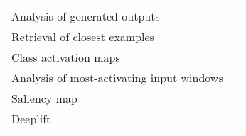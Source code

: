 \begin{tabular}{ll}
Analysis of generated outputs                          &                                                                                                                                                                               \cite{Hartmann2018} \\
Retrieval of closest examples                          &                                                                                                                                                                                  \cite{Deiss2018} \\
Class activation maps                                  &                                                                                                                                                                                  \cite{Ghosh2018} \\
Analysis of most-activating input windows              &                                                                                                                                                                              \cite{Hartmann2018b} \\
Saliency map                                           &                                                                                                                                                                               \cite{Vilamala2017} \\
Deeplift                                               &                                                                                                                                                                                \cite{Lawhern2018} \\
\bottomrule
\end{tabular}
